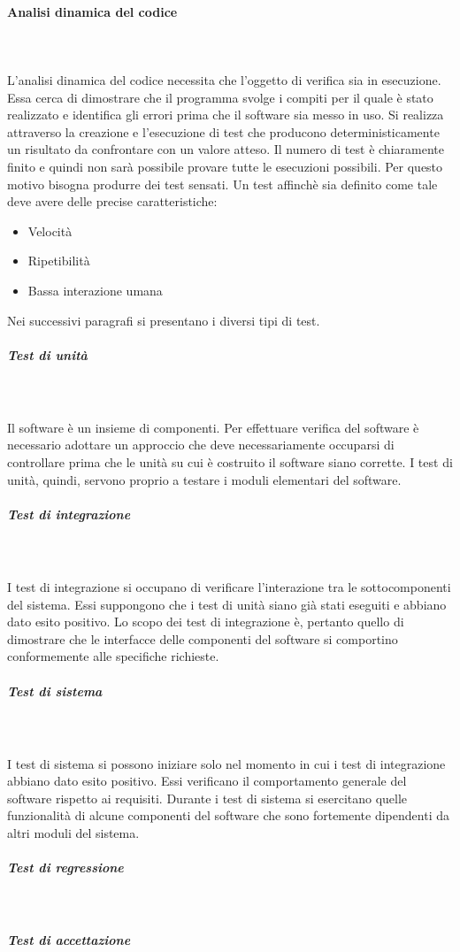 \documentclass[../norme-di-progetto.tex]{subfiles}
\begin{document}
\paragraph{Analisi dinamica del codice}\mbox{}\\
\label{par:analisi dinamica del codice}
\\L'analisi dinamica del codice necessita che l'oggetto di verifica sia in esecuzione. Essa cerca di dimostrare che il programma svolge i compiti per il quale è stato realizzato e identifica gli errori prima che il software sia messo in uso. Si realizza attraverso la creazione e l'esecuzione di test che producono deterministicamente un risultato da confrontare con un valore atteso. Il numero di test è chiaramente finito e quindi non sarà possibile provare tutte le esecuzioni possibili. Per questo motivo bisogna produrre dei test sensati. Un test affinchè sia definito come tale deve avere delle precise caratteristiche:
\begin{itemize}
	\item Velocità
	\item Ripetibilità
	\item Bassa interazione umana
\end{itemize}
Nei successivi paragrafi si presentano i diversi tipi di test.
\subparagraph{Test di unità}\mbox{}\\
\\ Il software è un insieme di componenti. Per effettuare verifica del software è necessario adottare un approccio  che deve necessariamente occuparsi di controllare prima che le unità su cui è costruito il software siano corrette. I test di unità, quindi, servono proprio a testare i moduli elementari del software. 
\subparagraph{Test di integrazione}\mbox{}\\
\\ I test di integrazione si occupano di verificare l'interazione tra le sottocomponenti del sistema. Essi suppongono che i test di unità siano già stati eseguiti e abbiano dato esito positivo. Lo scopo dei test di integrazione è, pertanto quello di dimostrare che le interfacce delle componenti del software si comportino conformemente alle specifiche richieste.
\subparagraph{Test di sistema}\mbox{}\\
\\ I test di sistema si possono iniziare solo nel momento in cui i test di integrazione abbiano dato esito positivo. Essi verificano il comportamento generale del software rispetto ai requisiti. Durante i test di sistema si esercitano quelle funzionalità di alcune componenti del software che sono fortemente dipendenti da altri moduli del sistema.
\subparagraph{Test di regressione}\mbox{}\\
\subparagraph{Test di accettazione}\mbox{}\\
\end{document}

